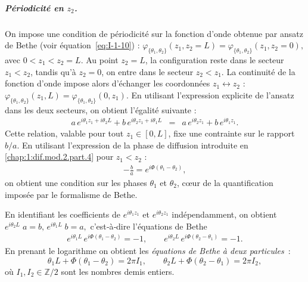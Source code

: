 \subparagraph{Périodicité en \( z_2 \).}  
On impose une condition de périodicité sur la fonction d’onde obtenue par ansatz de Bethe (voir équation~\eqref{eq:I-1-10}) :
\(
	\varphi_{\{\theta_1,\theta_2\}}(z_1, z_2 = L) = \varphi_{\{\theta_1,\theta_2\}}(z_1, z_2 = 0),
\)
avec \( 0 < z_1 < z_2 = L \).  
Au point \( z_2 = L \), la configuration reste dans le secteur \( z_1 < z_2 \), tandis qu’à \( z_2 = 0 \), on entre dans le secteur \( z_2 < z_1 \). La continuité de la fonction d’onde impose alors d’échanger les coordonnées \( z_1 \leftrightarrow z_2 \) :
\(
	\varphi_{\{\theta_1,\theta_2\}}(z_1, L) = \varphi_{\{\theta_1,\theta_2\}}(0, z_1).
\)
En utilisant l’expression explicite de l’ansatz dans les deux secteurs, on obtient l’égalité suivante :
\begin{eqnarray*}
	a\,e^{i\theta_1 z_1 + i\theta_2 L} + b\,e^{i\theta_2 z_1 + i\theta_1 L}
	&=& a\,e^{i\theta_2 z_1} + b\,e^{i\theta_1 z_1}.
\end{eqnarray*}
Cette relation, valable pour tout \( z_1 \in [0,L] \), fixe une contrainte sur le rapport \( b/a \). En utilisant l’expression de la phase de diffusion introduite en \eqref{chap:1:dif.mod.2.part.4} pour $z_1<z_2$ :
\begin{eqnarray*}
	-\frac{b}{a} = e^{i\Phi(\theta_1 - \theta_2)},
\end{eqnarray*}
on obtient une condition sur les phases \( \theta_1 \) et \( \theta_2 \), cœur de la quantification imposée par le formalisme de Bethe.

En identifiant les coefficients de $e^{i\theta_{1}z_{1}}$ et
$e^{i\theta_{2}z_{1}}$ indépendamment, on obtient
\(
	e^{i\theta_{2}L}\;a = b, 
	\,
	e^{i\theta_{1}L}\;b = a,
\)
c’est‑à‑dire l'équations de Bethe
\begin{eqnarray}\label{eq:PC2}
	e^{i\theta_{1}L}\,e^{i\Phi(\theta_{1}-\theta_{2})} = -1,
	\qquad
	e^{i\theta_{2}L}\,e^{i\Phi(\theta_{2}-\theta_{1})} = -1.	
\end{eqnarray}
En prenant le logarithme on obtient les \emph{équations de Bethe à deux
particules} :
\begin{equation}\label{eq:Bethe2}
	\theta_{1}L + \Phi(\theta_{1}-\theta_{2}) = 2\pi I_{1}, 
	\qquad
	\theta_{2}L + \Phi(\theta_{2}-\theta_{1}) = 2\pi I_{2},
\end{equation}
où $I_{1},I_{2}\in\mathbb{Z}/2$ sont les nombres demis entiers. 

